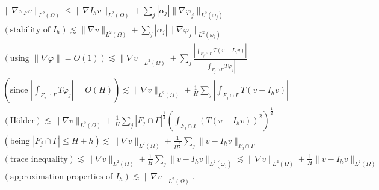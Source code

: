 \begin{multline*}
\|\nabla \pi_F v \|_{L^2(\Omega)} \leq \|\nabla I_h v\|_{L^2(\Omega)} + \sum_j|\alpha_j|\|\nabla \varphi _j\|_{L^2(\bar{\omega}_j)}
\\
(\text{stability of }I_h)\lesssim   \|\nabla  v\|_{L^2(\Omega)} + \sum_j|\alpha_j|\|\nabla \varphi _j\|_{L^2(\bar{\omega}_j)}
\\
\left(\text{using }\|\nabla \varphi\|=O(1)\right) \lesssim \|\nabla  v\|_{L^2(\Omega)} + \sum_j \frac{\left|\int_{F_j\cap \Gamma} T(v-I_h v)\right|}{\left|\int_{F_j\cap \Gamma}T\varphi _j\right|}
\\
\left(\text{since }\left|\int_{F_j\cap \Gamma}T\varphi _j\right|=O(H)\right) \lesssim  \|\nabla  v\|_{L^2(\Omega)} + \frac 1H \sum_j \left|\int_{F_j\cap \Gamma} T(v-I_h v)\right| 
\\
(\text{H\"older}) \lesssim  \|\nabla  v\|_{L^2(\Omega)} + \frac 1H \sum_j |F_j\cap \Gamma|^{\frac 12} \left(\int_{F_j\cap \Gamma} (T(v-I_h v))^2\right)^{\frac 12}
\\
(\text{being }|F_j\cap \Gamma| \leq H+h)\lesssim   \|\nabla  v\|_{L^2(\Omega)} + \frac {1}{H^{\frac 12}} \sum_j  \| v-I_h v\|_{F_j\cap \Gamma} 
\\
\left(\text{trace inequality} \right)\lesssim   \|\nabla  v\|_{L^2(\Omega)} + \frac {1}{H} \sum_j  \| v-I_h v\|_{L^2(\omega_j)} \lesssim \|\nabla  v\|_{L^2(\Omega)} + \frac {1}{H}  \| v-I_h v\|_{L^2(\Omega)} 
\\
(\text{approximation properties of }I_h)\lesssim \|\nabla  v\|_{L^2(\Omega)}.
\end{multline*}

